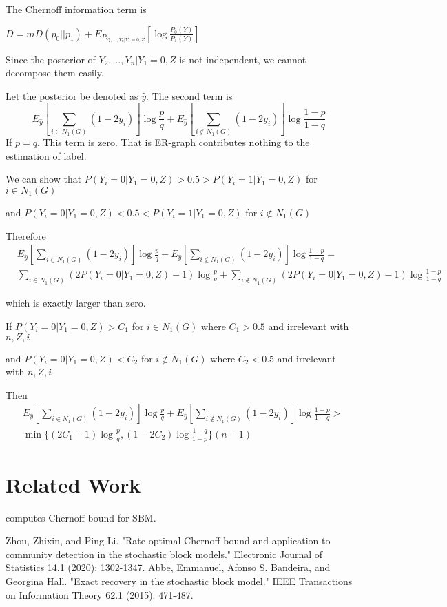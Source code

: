 \documentclass{article}
\begin{document}
The Chernoff information term is

$D=m D(p_0 || p_1) + E_{P_{Y_2, \dots, Y_n | Y_1 =0, Z}} [\log \frac{P_0(Y)}{P_1(Y)}]$

Since the posterior of $Y_2, \dots, Y_n | Y_1=0, Z$ is not independent, we cannot decompose them easily.

Let the posterior be denoted as $\hat{y}$. The second term is
$$
E_{\hat{y}} [\sum_{i \in N_1(G)} (1-2y_i)]  \log \frac{p}{q} + E_{\hat{y}} [\sum_{i \not\in N_1(G)} (1-2y_i)] \log \frac{1-p}{1-q}
$$
If $p=q$. This term is zero. That is ER-graph contributes nothing to the estimation of label.

We can show that $P(Y_i = 0 | Y_1 =0, Z) > 0.5 > P(Y_i = 1 | Y_1 = 0 , Z)$ for $i \in N_1(G)$

and $P(Y_i = 0 | Y_1 =0, Z) < 0.5 < P(Y_i = 1 | Y_1 = 0 , Z)$ for $i \not\in N_1(G)$

Therefore 
\begin{align*}
&E_{\hat{y}} [\sum_{i \in N_1(G)} (1-2y_i)]  \log \frac{p}{q} + E_{\hat{y}} [\sum_{i \not\in N_1(G)} (1-2y_i)] \log \frac{1-p}{1-q} =\\
&\sum_{i \in N_1(G)} (2 P(Y_i=0 | Y_1=0 ,Z) - 1) \log \frac{p}{q} + \sum_{i \not\in N_1(G)}(2P(Y_i=0 | Y_1 = 0, Z) - 1) \log \frac{1-p}{1-q}
\end{align*}


which is exactly larger than zero.

If $P(Y_i = 0 | Y_1 =0, Z) > C_1$ for $i\in N_1(G)$ where $C_1 > 0.5$ and irrelevant with $n, Z, i$

and   $P(Y_i = 0 | Y_1 =0, Z) < C_2$ for $i\not\in N_1(G)$ where $C_2 < 0.5$ and irrelevant with $n, Z, i$

Then 
\begin{align*}
&E_{\hat{y}} [\sum_{i \in N_1(G)} (1-2y_i)]  \log \frac{p}{q} + E_{\hat{y}} [\sum_{i \not\in N_1(G)} (1-2y_i)] \log \frac{1-p}{1-q}  >\\
& \min \{(2C_1 - 1)\log\frac{p}{q}, (1-2C_2)\log\frac{1-q}{1-p}\} (n-1)
\end{align*}
\section{Related Work}
\cite{cb} computes Chernoff bound for SBM.

\begin{thebibliography}{9}
	 Zhou, Zhixin, and Ping Li. "Rate optimal Chernoff bound and application to community detection in the stochastic block models." Electronic Journal of Statistics 14.1 (2020): 1302-1347.
	 Abbe, Emmanuel, Afonso S. Bandeira, and Georgina Hall. "Exact recovery in the stochastic block model." IEEE Transactions on Information Theory 62.1 (2015): 471-487.
\end{thebibliography}
\end{document}
